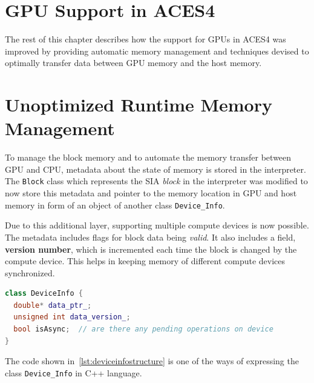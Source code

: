 \section{GPU Support in ACES4}
The rest of this chapter describes how the support for GPUs in ACES4 was improved
by providing automatic memory management and techniques devised to optimally transfer
data between GPU memory and the host memory.

\section{Unoptimized Runtime Memory Management}
To manage the block memory and to automate the memory transfer between GPU and CPU,
metadata about the state of memory is stored in the interpreter. The \texttt{Block} class
which represents the SIA \textit{block} in the interpreter was modified to now store
this metadata and pointer to the memory location in GPU and host memory in form of
an object of another class \texttt{Device\_Info}.

Due to this additional layer, supporting multiple compute devices is now possible.
The metadata includes flags for block data being \textit{valid}.
It also includes a field, \textbf{version number}, which is incremented each time the block is changed
by the compute device. This helps in keeping memory of different compute devices
synchronized.

\begin{lstlisting}[caption={\texttt{Device\_Info} Class structure},
  language=C++,
  label={lst:deviceinfostructure}]
class DeviceInfo {
  double* data_ptr_;
  unsigned int data_version_;
  bool isAsync;  // are there any pending operations on device
}
\end{lstlisting}

The code shown in~\ref{lst:deviceinfostructure} is one of the ways of expressing
the class \texttt{Device\_Info} in C++ language.

